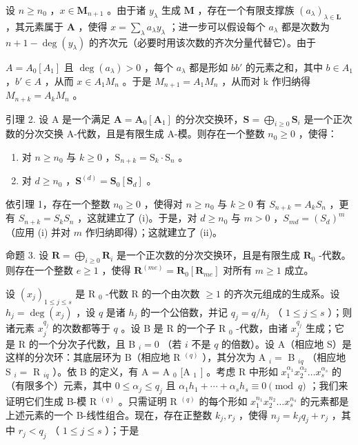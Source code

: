 设 \(n \geqslant n_0\) ，\(x \in \mathbf{M}_{n+1}\) 。由于诸 \(y_\lambda\) 生成 \(\mathbf{M}\) ，存在一个有限支撑族 \((a_\lambda)_{\lambda \in \mathbf{L}}\) ，其元素属于 \(\mathbf{A}\) ，使得 \(x = \sum_{\lambda} a_\lambda y_\lambda\) ；进一步可以假设每个 \(a_\lambda\) 都是次数为 \(n + 1 - \deg(y_\lambda)\) 的齐次元（必要时用该次数的齐次分量代替它）。由于

\(A = A_{0}[A_{1}]\) 且 \(\deg(a_{\lambda}) > 0\) ，每个 \(a_{\lambda}\) 都是形如 \(bb'\) 的元素之和，其中 \(b \in A_{1}\) ，\(b' \in A\) ，从而 \(x \in A_{1}M_{n}\) 。于是 \(M_{n+1} = A_{1}M_{n}\) ，从而对 k 作归纳得 \(M_{n+k} = A_{k}M_{n}\) 。

引理 2. 设 A 是一个满足 \(\mathbf{A} = \mathbf{A}_0[\mathbf{A}_1]\) 的分次交换环，\(\mathbf{S} = \bigoplus_{i\geqslant 0}\mathbf{S}_i\) 是一个正次数的分次交换 A-代数，且是有限生成 A-模。则存在一个整数 \(n_0\geqslant 0\) ，使得：

\begin{enumerate}
\def\labelenumi{(\roman{enumi})}
\item
  对 \(n \geqslant n_0\) 与 \(k \geqslant 0\) ，\(\mathrm{S}_{n+k} = \mathrm{S}_k \cdot \mathrm{S}_n\) 。
\item
  对 \(d \geqslant n_0\) ，\(\mathbf{S}^{(d)} = \mathbf{S}_0[\mathbf{S}_d]\) 。
\end{enumerate}

依引理 1，存在一个整数 \(n_0 \geqslant 0\) ，使得对 \(n \geqslant n_0\) 与 \(k \geqslant 0\) 有 \(S_{n+k} = A_kS_n\) ，更有 \(S_{n+k} = S_kS_n\) ，这就建立了 (i)。于是，对 \(d \geqslant n_0\) 与 \(m > 0\) ，\(S_{md} = (S_d)^m\) （应用 (i) 并对 \(m\) 作归纳即得）；这就建立了 (ii)。

命题 3. 设 \(\mathbf{R} = \bigoplus_{i\geqslant 0}\mathbf{R}_i\) 是一个正次数的分次交换环，且是有限生成 \(\mathbf{R}_0\) -代数。则存在一个整数 \(e\geqslant 1\) ，使得 \(\mathbf{R}^{(me)} = \mathbf{R}_0[\mathbf{R}_{me}]\) 对所有 \(m\geqslant 1\) 成立。

设 \((x_{j})_{1\leqslant j\leqslant s}\) 是 R \(_{0}\) -代数 R 的一个由次数 \(\geqslant 1\) 的齐次元组成的生成系。设 \(h_{j} = \deg(x_{j})\) ，设 \(q\) 是诸 \(h_{j}\) 的一个公倍数，并记 \(q_{j} = q/h_{j}\) （ \(1 \leqslant j \leqslant s\) ）；则诸元素 \(x_{j}^{q_{j}}\) 的次数都等于 \(q\) 。设 B 是 R 的一个子 R \(_{0}\) -代数，由诸 \(x_{j}^{q_{j}}\) 生成；它是 R 的一个分次子代数，且 B \(_{i} = 0\) （若 \(i\) 不是 \(q\) 的倍数）。设 A（相应地 S）是这样的分次环：其底层环为 B（相应地 R \(^{(q)}\) ），其分次为 A \(_{i} =\) B \(_{iq}\) （相应地 S \(_{i} =\) R \(_{iq}\) ）。依 B 的定义，有 A = A \(_{0}\) {[}A \(_{1}\) {]} 。考虑 R 中形如 \(x_{1}^{\alpha_{1}}x_{2}^{\alpha_{2}}\ldots x_{s}^{\alpha_{s}}\) 的（有限多个）元素，其中 \(0 \leqslant \alpha_{j} \leqslant q_{j}\) 且 \(\alpha_{1}h_{1} + \cdots + \alpha_{s}h_{s} \equiv 0 \pmod{q}\) ；我们来证明它们生成 B-模 R \(^{(q)}\) 。只需证明 R \(^{(q)}\) 的每个形如 \(x_{1}^{n_{1}}x_{2}^{n_{2}}\ldots x_{s}^{n_{s}}\) 的元素都是上述元素的一个 B-线性组合。现在，存在正整数 \(k_{j}, r_{j}\) ，使得 \(n_{j} = k_{j}q_{j} + r_{j}\) ，其中 \(r_{j} < q_{j}\) （ \(1 \leqslant j \leqslant s\) ）；于是


